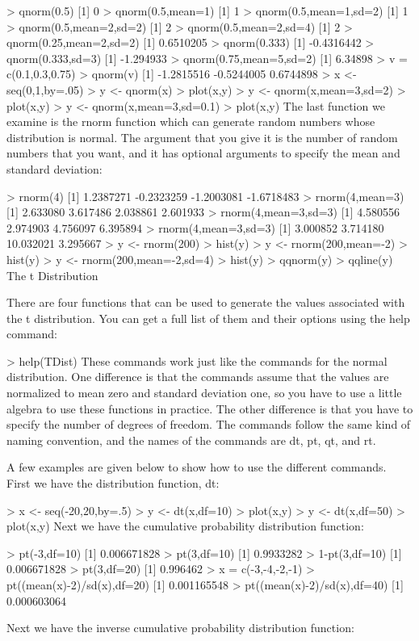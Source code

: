 \documentclass[a4paper,12pt]{article}
\begin{document}
> qnorm(0.5)
[1] 0
> qnorm(0.5,mean=1)
[1] 1
> qnorm(0.5,mean=1,sd=2)
[1] 1
> qnorm(0.5,mean=2,sd=2)
[1] 2
> qnorm(0.5,mean=2,sd=4)
[1] 2
> qnorm(0.25,mean=2,sd=2)
[1] 0.6510205
> qnorm(0.333)
[1] -0.4316442
> qnorm(0.333,sd=3)
[1] -1.294933
> qnorm(0.75,mean=5,sd=2)
[1] 6.34898
> v = c(0.1,0.3,0.75)
> qnorm(v)
[1] -1.2815516 -0.5244005  0.6744898
> x <- seq(0,1,by=.05)
> y <- qnorm(x)
> plot(x,y)
> y <- qnorm(x,mean=3,sd=2)
> plot(x,y)
> y <- qnorm(x,mean=3,sd=0.1)
> plot(x,y)
The last function we examine is the rnorm function which can generate random numbers whose distribution is normal. The argument that you give it is the number of random numbers that you want, and it has optional arguments to specify the mean and standard deviation:

> rnorm(4)
[1]  1.2387271 -0.2323259 -1.2003081 -1.6718483
> rnorm(4,mean=3)
[1] 2.633080 3.617486 2.038861 2.601933
> rnorm(4,mean=3,sd=3)
[1] 4.580556 2.974903 4.756097 6.395894
> rnorm(4,mean=3,sd=3)
[1]  3.000852  3.714180 10.032021  3.295667
> y <- rnorm(200)
> hist(y)
> y <- rnorm(200,mean=-2)
> hist(y)
> y <- rnorm(200,mean=-2,sd=4)
> hist(y)
> qqnorm(y)
> qqline(y)
The t Distribution

There are four functions that can be used to generate the values associated with the t distribution. You can get a full list of them and their options using the help command:

> help(TDist)
These commands work just like the commands for the normal distribution. One difference is that the commands assume that the values are normalized to mean zero and standard deviation one, so you have to use a little algebra to use these functions in practice. The other difference is that you have to specify the number of degrees of freedom. The commands follow the same kind of naming convention, and the names of the commands are dt, pt, qt, and rt.

A few examples are given below to show how to use the different commands. First we have the distribution function, dt:

> x <- seq(-20,20,by=.5)
> y <- dt(x,df=10)
> plot(x,y)
> y <- dt(x,df=50)
> plot(x,y)
Next we have the cumulative probability distribution function:

> pt(-3,df=10)
[1] 0.006671828
> pt(3,df=10)
[1] 0.9933282
> 1-pt(3,df=10)
[1] 0.006671828
> pt(3,df=20)
[1] 0.996462
> x = c(-3,-4,-2,-1)
> pt((mean(x)-2)/sd(x),df=20)
[1] 0.001165548
> pt((mean(x)-2)/sd(x),df=40)
[1] 0.000603064

Next we have the inverse cumulative probability distribution function:
\end{document}
